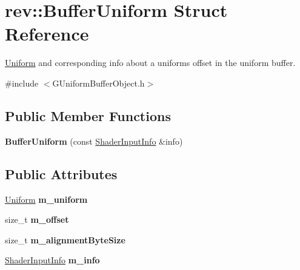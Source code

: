 \hypertarget{structrev_1_1_buffer_uniform}{}\section{rev\+::Buffer\+Uniform Struct Reference}
\label{structrev_1_1_buffer_uniform}


\mbox{\hyperlink{structrev_1_1_uniform}{Uniform}} and corresponding info about a uniform\textquotesingle{}s offset in the uniform buffer.  




{\ttfamily \#include $<$G\+Uniform\+Buffer\+Object.\+h$>$}

\subsection*{Public Member Functions}
\begin{DoxyCompactItemize}
\item 
\mbox{\label{structrev_1_1_buffer_uniform_a22b3fcef592525dfe6d246190cd8b547}} 
{\bfseries Buffer\+Uniform} (const \mbox{\hyperlink{structrev_1_1_shader_input_info}{Shader\+Input\+Info}} \&info)
\end{DoxyCompactItemize}
\subsection*{Public Attributes}
\begin{DoxyCompactItemize}
\item 
\mbox{\label{structrev_1_1_buffer_uniform_aa47764b46679f37e8b722a85858e3ccc}} 
\mbox{\hyperlink{structrev_1_1_uniform}{Uniform}} {\bfseries m\+\_\+uniform}
\item 
\mbox{\label{structrev_1_1_buffer_uniform_a21a68bf2577226720e942c7e1af7f56e}} 
size\+\_\+t {\bfseries m\+\_\+offset}
\item 
\mbox{\label{structrev_1_1_buffer_uniform_a2d876235c761c2c0340b9990a6f2831a}} 
size\+\_\+t {\bfseries m\+\_\+alignment\+Byte\+Size}
\item 
\mbox{\label{structrev_1_1_buffer_uniform_a18b40d7e91addd67f6aeb92f8bcfd8b7}} 
\mbox{\hyperlink{structrev_1_1_shader_input_info}{Shader\+Input\+Info}} {\bfseries m\+\_\+info}
\end{DoxyCompactItemize}


